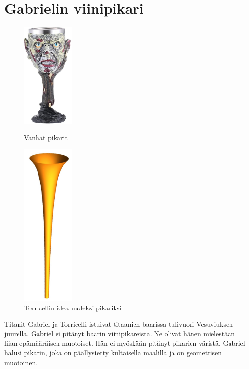 \clearpage

\section{Gabrielin viinipikari}

\begin{figure}
    \begin{center}
    \includegraphics[width=0.23\textwidth]{kuvat/viinipikari_hirvio.jpg}
    \caption*{Vanhat pikarit}
    \medskip
    \includegraphics[width=0.23\textwidth]{kuvat/gabrielin_torvi.jpeg}
    \caption*{Torricellin idea uudeksi pikariksi}
    \end{center}
\end{figure}

Titanit Gabriel ja Torricelli istuivat titaanien baarissa tulivuori Vesuviuksen juurella. Gabriel ei pitänyt baarin viinipikareista. Ne olivat hänen mielestään liian epämääräisen muotoiset. Hän ei myöskään pitänyt pikarien väristä. Gabriel halusi pikarin, joka on päällystetty kultaisella maalilla ja on geometrisen muotoinen.

